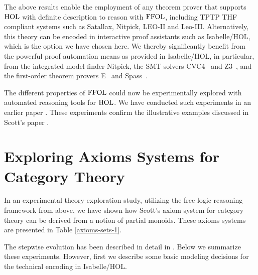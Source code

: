


The above results enable the employment of any theorem prover that
supports $\text{\textrm{HOL}}$ with definite description to reason with $\text{\textrm{FFOL}}$,
including TPTP THF \cite{J22} compliant systems such as Satallax,
Nitpick, LEO-II and Leo-III. Alternatively, this theory can be encoded
in interactive proof assistants such as Isabelle/HOL, which is the
option we have chosen here. We thereby significantly benefit
from the powerful proof automation means as provided in Isabelle/HOL,
in particular, from the integrated model finder Nitpick, the SMT
solvers CVC4~\cite{CVC4} and Z3~\cite{Z3}, and the first-order theorem
provers E~\cite{E} and Spass~\cite{Spass}.



The different properties of $\text{\textrm{FFOL}}$ could now be experimentally explored with
automated reasoning tools for $\text{\textrm{HOL}}$. We have conducted such
experiments in 
an earlier paper \cite{ICMS}. These experiments confirm the
illustrative examples discussed in Scott's paper \cite{Scott67}.


\section{Exploring Axioms Systems for Category Theory}
In an experimental theory-exploration study, utilizing the
free logic reasoning framework from above, 
we have shown how Scott's
\cite{Scott79} axiom system for category theory can be derived from a
notion of partial monoids. These axioms systems are presented in Table \ref{axioms-sets-1}.

The stepwise evolution has been described in detail in
\cite{ArXiv}. Below we summarize these experiments.  However, first we
describe some basic modeling decisions for the technical encoding in
Isabelle/HOL. 

